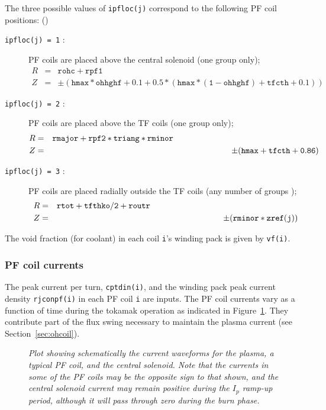 \documentclass[11pt,a4paper]{report}
\begin{document}
The three possible values of \texttt{ipfloc(j)} correspond to the following PF
coil positions: ()
\begin{description} %

\item [\texttt{ipfloc(j) = 1} :]  PF coils are placed above the central solenoid (one
group only);
\begin{eqnarray*}
R & = & \mathtt{rohc + rpf1} \\
Z & = & \pm
\mathtt{( hmax*ohhghf + 0.1 + 0.5*( hmax*(1-ohhghf)+tfcth+0.1) )}
\end{eqnarray*}

\item [\texttt{ipfloc(j) = 2} :]  PF coils are placed above the TF coils (one
group only);
\begin{eqnarray*}
R & = & \mathtt{rmajor + rpf2*triang*rminor} \hspace{62mm} \\
Z & = & \pm (\mathtt{hmax + tfcth + 0.86})
\end{eqnarray*}

\item [\texttt{ipfloc(j) = 3} :]  PF coils are placed radially outside the TF
coils (any number of groups );
\begin{eqnarray*}
R & = & \mathtt{rtot + tfthko/2 + routr} \hspace{63mm}\\
Z & = & \pm(\mathtt{rminor*zref(j)})
\end{eqnarray*}

\end{description}

The void fraction (for coolant) in each coil \texttt{i}'s winding pack is
given by \texttt{vf(i)}.

\subsubsection{PF coil currents}

The peak current per turn, \texttt{cptdin(i)}, and the winding pack peak
current density \texttt{rjconpf(i)} in each PF coil \texttt{i} are inputs. The
PF coil currents vary as a function of time during the tokamak operation as
indicated in Figure~\ref{fig:current_vs_time}. They contribute part of the
flux swing necessary to maintain the plasma current (see
Section~\ref{sec:ohcoil}).

\begin{figure}[tbph]
\caption[Coil and plasma current waveforms]
{\label{fig:current_vs_time}
  \textit{Plot showing schematically the current waveforms for the plasma, a
    typical PF coil, and the central solenoid. Note that the currents in some
    of the PF coils may be the opposite sign to that shown, and the central
    solenoid current may remain positive during the $I_p$ ramp-up period,
    although it will pass through zero during the burn phase.}
}
\end{figure}
\end{document}
